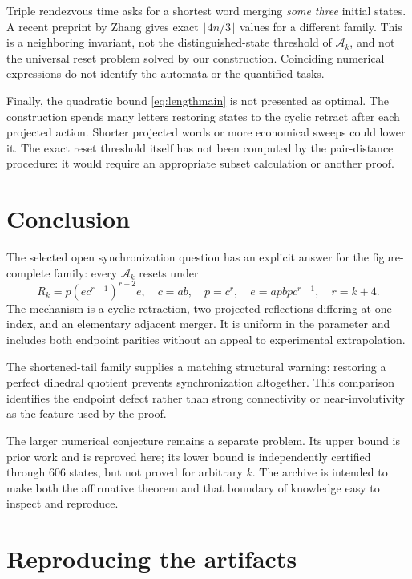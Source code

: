 \documentclass[11pt,a4paper]{article}
\numberwithin{equation}{section}
\theoremstyle{definition}
\theoremstyle{remark}
\newcommand{\Ak}{\mathcal A_k}
\begin{document}
Triple rendezvous time asks for a shortest word merging \emph{some three}
initial states. A recent preprint by Zhang \cite{Zhang2026} gives exact
$\lfloor4n/3\rfloor$ values for a different family. This is a neighboring
invariant, not the distinguished-state threshold of $\Ak$, and not the
universal reset problem solved by our construction. Coinciding numerical
expressions do not identify the automata or the quantified tasks.

Finally, the quadratic bound \eqref{eq:lengthmain} is not presented as
optimal. The construction spends many letters restoring states to the
cyclic retract after each projected action. Shorter projected words or
more economical sweeps could lower it. The exact reset threshold itself
has not been computed by the pair-distance procedure: it would require
an appropriate subset calculation or another proof.

\section{Conclusion}

The selected open synchronization question has an explicit answer for the
figure-complete family: every $\Ak$ resets under
\[
 \boxed{\;R_k=p(e c^{r-1})^{r-2}e,\quad
 c=ab,\quad p=c^r,\quad e=a p b p c^{r-1},\quad r=k+4.\;}
\]
The mechanism is a cyclic retraction, two projected reflections differing
at one index, and an elementary adjacent merger. It is uniform in the
parameter and includes both endpoint parities without an appeal to
experimental extrapolation.

The shortened-tail family supplies a matching structural warning: restoring
a perfect dihedral quotient prevents synchronization altogether. This
comparison identifies the endpoint defect rather than strong connectivity
or near-involutivity as the feature used by the proof.

The larger numerical conjecture remains a separate problem. Its upper
bound is prior work and is reproved here; its lower bound is independently
certified through $606$ states, but not proved for arbitrary $k$. The
archive is intended to make both the affirmative theorem and that boundary
of knowledge easy to inspect and reproduce.

\appendix
\section{Reproducing the artifacts}
\label{app:reproduce}
\end{document}
